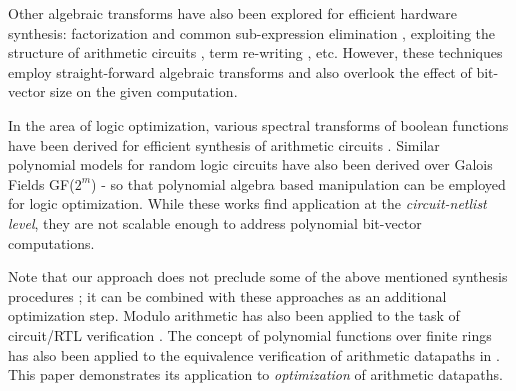 Other algebraic transforms have also been explored for efficient
hardware synthesis: factorization  and common sub-expression
elimination \cite{anup:iccad_04} \cite{anup:vlsi_05}, exploiting
the structure of arithmetic circuits \cite{ienne}, term re-writing
\cite{arvind:term-rewrite}, etc. However, these techniques employ
straight-forward algebraic transforms and
also overlook the effect of bit-vector size on the given computation.

In the area of logic optimization, various spectral transforms of
boolean functions have been derived for efficient synthesis of
arithmetic circuits \cite{spectra:book}. Similar polynomial models for
random logic circuits have also been derived over Galois Fields
GF($2^m$) \cite{pradhan_galois}  \cite{pradhan_modd} \cite{galois}- so
that polynomial algebra based manipulation can be employed for logic
optimization. While these works find application at the {\it circuit-netlist
level}, they are not scalable enough to address polynomial bit-vector
computations. 


Note that our approach does not preclude some of the above mentioned
synthesis procedures \cite{anup:vlsi_05} \cite{anup:iccad_04}
\cite{multi-word-synth}; it can be combined with these approaches
as an additional optimization step. Modulo arithmetic has also been
applied to the task of circuit/RTL verification %
\cite{Huang:tcad01}. The concept of polynomial
functions over finite rings has also been applied to the equivalence
verification of arithmetic datapaths in \cite{iccad05}
\cite{nam:date06}.  This paper demonstrates its application to {\it
optimization} of arithmetic datapaths. 





